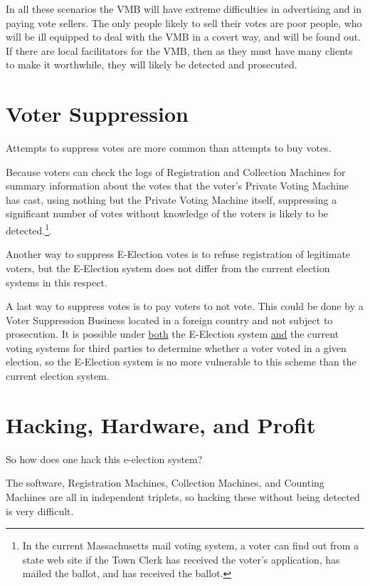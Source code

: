 \documentclass[12pt]{article}
\begin{document}
In all these scenarios the VMB will have extreme difficulties in
advertising and in paying vote sellers.
The only people likely to sell their votes are poor people,
who will be ill equipped to deal with the VMB in a covert way, and
will be found out.
If there are local facilitators for the VMB, then
as they must have many clients to
make it worthwhile, they will likely be detected and prosecuted.%


\section{Voter Suppression}

Attempts to suppress votes are more common than attempts to buy votes.

Because voters can check the logs of Registration and Collection Machines
for summary information about the votes that the voter's Private Voting Machine
has cast, using nothing but the Private Voting Machine itself,
suppressing a significant number of votes without knowledge of
the voters is likely
to be detected.\footnote{In the current Massachusetts mail voting
system, a voter can find out from a state web site if the Town Clerk
has received the voter's application, has mailed the ballot, and has
received the ballot.}.

Another way to suppress E-Election votes is to refuse registration
of legitimate voters, but the E-Election system does not differ
from the current election systems in this respect.

A last way to suppress votes is to pay voters to not vote.  This
could be done by a Voter Suppression Business located in a foreign
country and not subject to prosecution.  It is possible under \underline{both}
the E-Election system \underline{and} the current voting systems
for third parties to determine whether a voter voted in a given
election, so the E-Election system is no more vulnerable to this
scheme than the current election system.

\section{Hacking, Hardware, and Profit}

So how does one hack this e-election system?

The software, Registration Machines, Collection Machines,
and Counting Machines are all in independent triplets, so
hacking these without being detected is very difficult.
\end{document}
